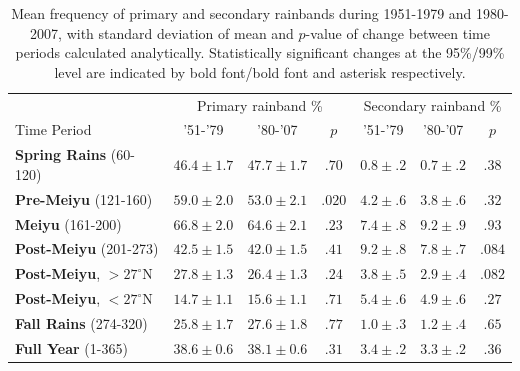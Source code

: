 \documentclass{ametsoc}
\begin{document}
\begin{table}

\centering

\caption{Mean frequency of primary and secondary rainbands during 1951-1979 and 1980-2007, with standard deviation of mean and $p$-value of change between time periods calculated analytically. Statistically significant changes at the 95\%/99\% level are indicated by bold font/bold font and asterisk respectively.}

\begin{tabular}{ l c c c c c c}
	& \multicolumn{3}{c}{Primary rainband \%} & \multicolumn{3}{c}{Secondary rainband \%} \\
	Time Period & '51-'79 & '80-'07 & $p$ & '51-'79 & '80-'07 & $p$ \\
	\hline	
	\textbf{Spring Rains} (60-120)		& $46.4 \pm 1.7$ & $47.7 \pm 1.7$ & $ .70 $ 	& $0.8 \pm .2$ & $0.7 \pm .2$ & $.38$ \\
	\textbf{Pre-Meiyu} (121-160) 		& $\boldsymbol{59.0 \pm 2.0}$ & $\boldsymbol{53.0 \pm 2.1}$ & $ \boldsymbol{.020} $ & $4.2 \pm .6$ & $3.8 \pm .6$ & $.32$ \\
	\textbf{Meiyu} (161-200)			& $66.8 \pm 2.0$ & $64.6 \pm 2.1$ & $ .23 $ 	& $7.4 \pm .8$ & $9.2 \pm .9$  & $.93$ \\
	\textbf{Post-Meiyu} (201-273)		& $42.5 \pm 1.5$ & $42.0 \pm 1.5$ & $ .41 $	& $9.2 \pm .8$ & $7.8 \pm .7$ & $.084$ \\
	\textbf{Post-Meiyu}, $>27^\circ$N 	& $27.8 \pm 1.3$ & $26.4 \pm 1.3$ & $ .24 $ 	& $3.8 \pm .5$ & $2.9 \pm .4$ & $.082$ \\
	\textbf{Post-Meiyu}, $<27^\circ$N 	& $14.7 \pm 1.1 $ & $15.6 \pm 1.1$ & $ .71 $ 	& $5.4 \pm .6$ & $4.9 \pm .6$ & $.27$  \\
	\textbf{Fall Rains} (274-320)			& $25.8 \pm 1.7 $ & $27.6 \pm 1.8$ & $ .77 $ 	& $1.0 \pm .3$ & $1.2 \pm .4$ & $.65$ \\
	\textbf{Full Year} (1-365)			& $38.6 \pm 0.6 $ & $38.1 \pm 0.6$ & $ .31 $ 	& $3.4 \pm .2$ & $3.3 \pm .2$ & $.36$ \\

\end{tabular}
\label{tab:t35}
\end{table}
\end{document}
